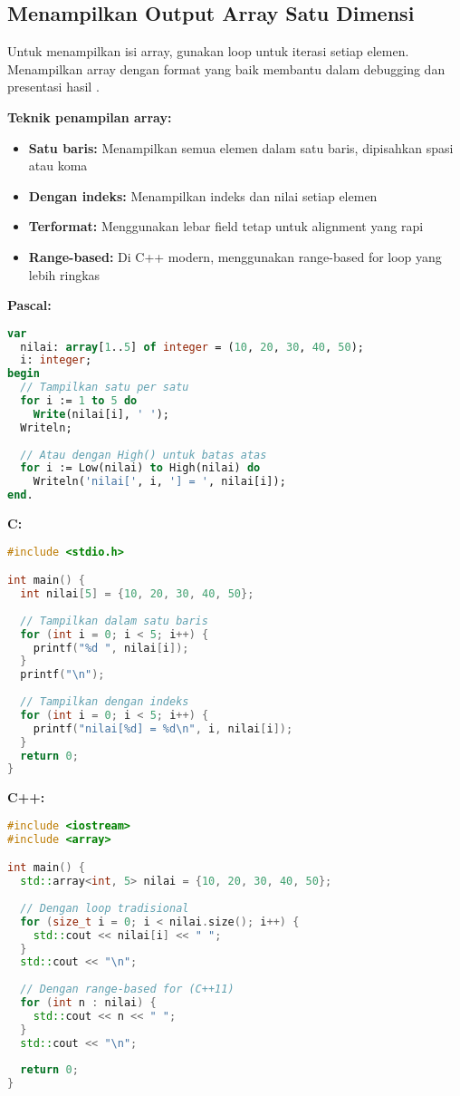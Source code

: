 \documentclass[../main.tex]{subfiles}
\begin{document}
\subsection{Menampilkan Output Array Satu Dimensi}
Untuk menampilkan isi array, gunakan loop untuk iterasi setiap elemen. Menampilkan array dengan format yang baik membantu dalam debugging dan presentasi hasil \parencite{tutorialspoint-c-arrays,cplusplus-arrays,galuhratna-array-c}.

\textbf{Teknik penampilan array:}
\begin{itemize}
  \item \textbf{Satu baris:} Menampilkan semua elemen dalam satu baris, dipisahkan spasi atau koma
  \item \textbf{Dengan indeks:} Menampilkan indeks dan nilai setiap elemen
  \item \textbf{Terformat:} Menggunakan lebar field tetap untuk alignment yang rapi
  \item \textbf{Range-based:} Di C++ modern, menggunakan range-based for loop yang lebih ringkas
\end{itemize}

\textbf{Pascal:}
\begin{lstlisting}[language=Pascal, caption={Menampilkan array di Pascal}]
var
  nilai: array[1..5] of integer = (10, 20, 30, 40, 50);
  i: integer;
begin
  // Tampilkan satu per satu
  for i := 1 to 5 do
    Write(nilai[i], ' ');
  Writeln;
  
  // Atau dengan High() untuk batas atas
  for i := Low(nilai) to High(nilai) do
    Writeln('nilai[', i, '] = ', nilai[i]);
end.
\end{lstlisting}

\textbf{C:}
\begin{lstlisting}[language=C, caption={Menampilkan array di C}]
#include <stdio.h>

int main() {
  int nilai[5] = {10, 20, 30, 40, 50};
  
  // Tampilkan dalam satu baris
  for (int i = 0; i < 5; i++) {
    printf("%d ", nilai[i]);
  }
  printf("\n");
  
  // Tampilkan dengan indeks
  for (int i = 0; i < 5; i++) {
    printf("nilai[%d] = %d\n", i, nilai[i]);
  }
  return 0;
}
\end{lstlisting}

\textbf{C++:}
\begin{lstlisting}[language=C++, caption={Menampilkan array di C++}]
#include <iostream>
#include <array>

int main() {
  std::array<int, 5> nilai = {10, 20, 30, 40, 50};
  
  // Dengan loop tradisional
  for (size_t i = 0; i < nilai.size(); i++) {
    std::cout << nilai[i] << " ";
  }
  std::cout << "\n";
  
  // Dengan range-based for (C++11)
  for (int n : nilai) {
    std::cout << n << " ";
  }
  std::cout << "\n";
  
  return 0;
}
\end{lstlisting}
\end{document}
